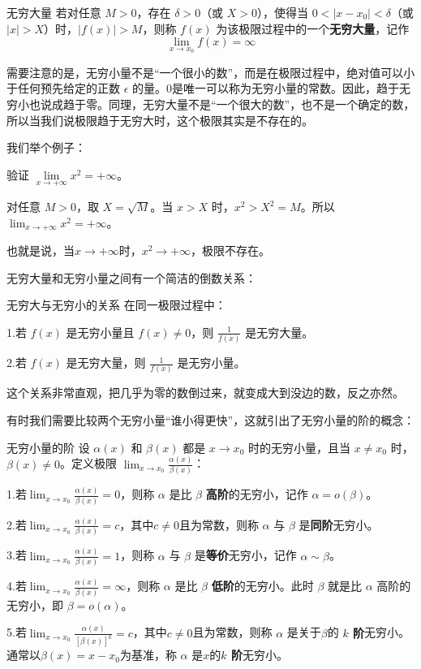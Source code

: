 \begin{definition}{无穷大量}{}
若对任意 $M > 0$，存在 $\delta > 0$（或 $X > 0$），使得当 $0 < |x - x_0| < \delta$（或 $|x| > X$）时，$|f(x)| > M$，则称 $f(x)$ 为该极限过程中的一个\textbf{无穷大量}，记作
\[
\lim_{x \to x_0} f(x) = \infty
\]
\end{definition}

需要注意的是，无穷小量不是“一个很小的数”，而是在极限过程中，绝对值可以小于任何预先给定的正数 $\epsilon$ 的量。$0 $是唯一可以称为无穷小量的常数。因此，趋于无穷小也说成趋于零。同理，无穷大量不是“一个很大的数”，也不是一个确定的数，所以当我们说极限趋于无穷大时，这个极限其实是不存在的。

我们举个例子：

\begin{myexample}
  验证 $\lim\limits_{x \to +\infty} x^2 = +\infty$。

  对任意 $M > 0$，取 $X = \sqrt{M}$。当 $x > X$ 时，$x^2 > X^2 = M$。所以 $\lim_{x \to +\infty} x^2 = +\infty$。
\end{myexample}

也就是说，当$x \to +\infty$时，$x^2 \to +\infty$，极限不存在。

无穷大量和无穷小量之间有一个简洁的倒数关系：

\begin{theorem}{无穷大与无穷小的关系}{}
在同一极限过程中：

1.若 $f(x)$ 是无穷小量且 $f(x) \neq 0$，则 $\frac{1}{f(x)}$ 是无穷大量。

2.若 $f(x)$ 是无穷大量，则 $\frac{1}{f(x)}$ 是无穷小量。

\end{theorem}

这个关系非常直观，把几乎为零的数倒过来，就变成大到没边的数，反之亦然。

有时我们需要比较两个无穷小量“谁小得更快”，这就引出了无穷小量的阶的概念：

\begin{definition}{无穷小量的阶}{}
设 $\alpha(x)$ 和 $\beta(x)$ 都是 $x \to x_0$ 时的无穷小量，且当 $x \neq x_0$ 时， $\beta(x) \neq 0$。定义极限
\(
\lim_{x \to x_0} \frac{\alpha(x)}{\beta(x)}
\)：

1.若$\lim_{x \to x_0} \frac{\alpha(x)}{\beta(x)}
=0$，则称 $\alpha$ 是比 $\beta$ \textbf{高阶}的无穷小，记作 $\alpha = o(\beta)$。

2.若$\lim_{x \to x_0} \frac{\alpha(x)}{\beta(x)}
=c$，其中$c \neq 0$且为常数，则称 $\alpha$ 与 $\beta$ 是\textbf{同阶}无穷小。

3.若$\lim_{x \to x_0} \frac{\alpha(x)}{\beta(x)}
=1$，则称 $\alpha$ 与 $\beta$ 是\textbf{等价}无穷小，记作 $\alpha \sim \beta$。

4.若$\lim_{x \to x_0} \frac{\alpha(x)}{\beta(x)}
=\infty$，则称 $\alpha$ 是比 $\beta$ \textbf{低阶}的无穷小。此时 $\beta$ 就是比 $\alpha$ 高阶的无穷小，即 $\beta = o(\alpha)$。

5.若$\lim_{x \to x_0} \frac{\alpha(x)}{[\beta(x)]^k}=c$，其中$c \neq 0$且为常数，则称 $\alpha$ 是关于$\beta$的 \textbf{$k$ 阶}无穷小。通常以$\beta (x) = x-x_0$为基准，称 $\alpha$ 是$x$的\textbf{$k$ 阶}无穷小。

\end{definition}

